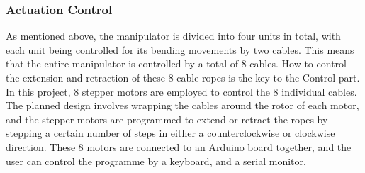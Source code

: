 \subsubsection{Actuation Control}
As mentioned above, the manipulator is divided into four units in total, with each unit being controlled for its 
bending movements by two cables. This means that the entire manipulator is controlled by a total of 8 cables. How 
to control the extension and retraction of these 8 cable ropes is the key to the Control part. \\
In this project, 8 stepper motors are employed to control the 8 individual cables. The planned design involves 
wrapping the cables around the rotor of each motor, and the stepper motors are programmed to extend or retract 
the ropes by stepping a certain number of steps in either a counterclockwise or clockwise direction. These 8 motors 
are connected to an Arduino board together, and the user can control the programme by a keyboard, and a serial monitor. \\
